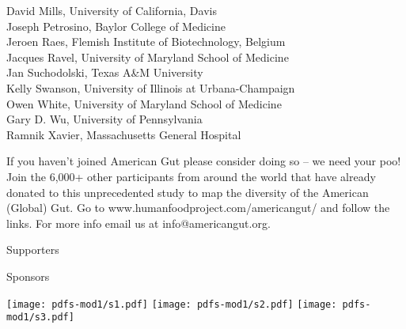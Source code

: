 \documentclass[10pt,letterpaper]{article}
\begin{document}
{{David Mills, University of California, Davis\\
Joseph Petrosino, Baylor College of Medicine\\
Jeroen Raes, Flemish Institute of Biotechnology, Belgium\\
Jacques Ravel, University of Maryland School of Medicine\\
Jan Suchodolski, Texas A\&M University\\
Kelly Swanson, University of Illinois at Urbana-Champaign\\
Owen White, University of Maryland School of Medicine\\
Gary D. Wu, University of Pennsylvania\\
Ramnik Xavier, Massachusetts General Hospital
}
}

\begin{framed}
If you haven't joined American Gut please consider doing so -- we need your poo!  Join the 6,000+ other participants from around the world that have already donated to this unprecedented study to map the diversity of the American (Global) Gut.  Go to www.humanfoodproject.com/americangut/ and follow the links.  For more info email us at info@americangut.org.
\end{framed}

\colorbox{agpGray}{\parbox{0.66\textwidth}{\vspace{1mm} \large \centering Supporters \vspace{1mm}}}
\hspace{1mm}
\colorbox{agpGray}{\parbox{0.323\textwidth}{\vspace{1mm} \large \centering Sponsors \vspace{1mm}}}

\texttt{[image: pdfs-mod1/s1.pdf]}
\texttt{[image: pdfs-mod1/s2.pdf]}
\texttt{[image: pdfs-mod1/s3.pdf]}
\end{document}
